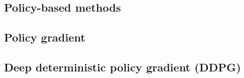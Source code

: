 \subsection{Policy-based methods}

\subsection{Policy gradient}

\subsection{Deep deterministic policy gradient (DDPG)}

